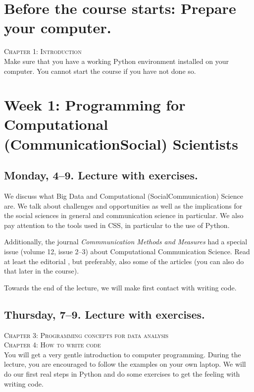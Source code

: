 
\section*{Before the course starts: Prepare your computer.}

\textsc{ Chapter 1: Introduction}\\
Make sure that you have a working Python environment installed on your computer. You cannot start the course if you have not done so.

\section*{Week 1: Programming for Computational (Communication\textbar Social) Scientists}
\subsection*{Monday, 4--9. Lecture with exercises.}


\textsc{  \cite{Kitchin2014}}
\textsc{ \cite{Hilbert2019}}


We discuss what Big Data and Computational (Social\textbar Communication) Science are. We talk about challenges and opportunities as well as the implications for the social sciences in general and communication science in particular. We also pay attention to the tools used in CSS, in particular to the use of Python.

Additionally, the journal \textit{Commmunication Methods and Measures} had a special issue (volume 12, issue 2--3) about Computational Communication Science. Read at least the editorial \citep{VanAtteveldt2018a}, but preferably, also some of the articles (you can also do that later in the course).

Towards the end of the lecture, we will make first contact with writing code.

\subsection*{Thursday, 7--9. Lecture with exercises.}
\textsc{ Chapter 3: Programming concepts for data analysis}\\
\textsc{ Chapter 4: How to write code}\\

You will get a very gentle introduction to computer programming. During the lecture, you are encouraged to follow the examples on your own laptop.
We will do our first real steps in Python and do some exercises to get the feeling with writing code.

